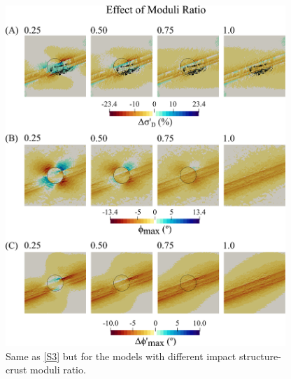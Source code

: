 \documentclass[draft,jgrga]{agutexSI2019}
\begin{document}
\begin{article}
\begin{figure}[ht]
\includegraphics[width=25pc]{Figures/effect_of_moduli_ratio.png}
\caption{Same as \ref{S3} but for the models with different impact structure-crust moduli ratio.}
\label{S6}
\end{figure}

\vspace{10mm} %

\pagebreak






















\end{article}
\end{document}
